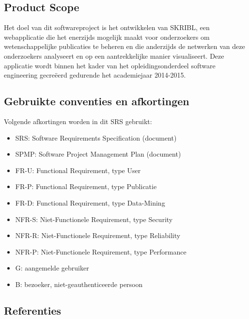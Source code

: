 \documentclass{article}
\begin{document}
\subsection{Product Scope}
Het doel van dit softwareproject is het ontwikkelen van SKRIBL, een webapplicatie die het enerzijds mogelijk maakt voor onderzoekers om wetenschappelijke publicaties te beheren en die anderzijds de netwerken van deze onderzoekers analyseert en op een aantrekkelijke manier visualiseert. Deze applicatie wordt binnen het kader van het opleidingsonderdeel software engineering gecre\"{e}erd gedurende het academiejaar 2014-2015.

\subsection{Gebruikte conventies en afkortingen}
\noindent Volgende afkortingen worden in dit SRS gebruikt:
\begin{itemize}
\item SRS: Software Requirements Specification (document)
\item SPMP: Software Project Management Plan (document)
\item FR-U: Functional Requirement, type User
\item FR-P: Functional Requirement, type Publicatie
\item FR-D: Functional Requirement, type Data-Mining
\item NFR-S: Niet-Functionele Requirement, type Security
\item NFR-R: Niet-Functionele Requirement, type Reliability
\item NFR-P: Niet-Functionele Requirement, type Performance
\item G: aangemelde gebruiker
\item B: bezoeker, niet-geauthenticeerde persoon 
\end{itemize}


\subsection{Referenties}
\begingroup
\renewcommand{\section}[2]{}%

\endgroup
\end{document}
